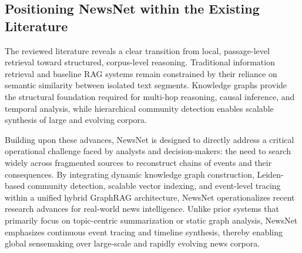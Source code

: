 \documentclass[preprint,10pt]{article}
\begin{document}
\subsection{Positioning NewsNet within the Existing Literature}

The reviewed literature reveals a clear transition from local, passage-level retrieval toward structured, corpus-level reasoning. Traditional information retrieval and baseline RAG systems remain constrained by their reliance on semantic similarity between isolated text segments. Knowledge graphs provide the structural foundation required for multi-hop reasoning, causal inference, and temporal analysis, while hierarchical community detection enables scalable synthesis of large and evolving corpora.

Building upon these advances, NewsNet is designed to directly address a critical operational challenge faced by analysts and decision-makers: the need to search widely across fragmented sources to reconstruct chains of events and their consequences. By integrating dynamic knowledge graph construction, Leiden-based community detection, scalable vector indexing, and event-level tracing within a unified hybrid GraphRAG architecture, NewsNet operationalizes recent research advances for real-world news intelligence. Unlike prior systems that primarily focus on topic-centric summarization or static graph analysis, NewsNet emphasizes continuous event tracing and timeline synthesis, thereby enabling global sensemaking over large-scale and rapidly evolving news corpora.

{}

\end{document}
